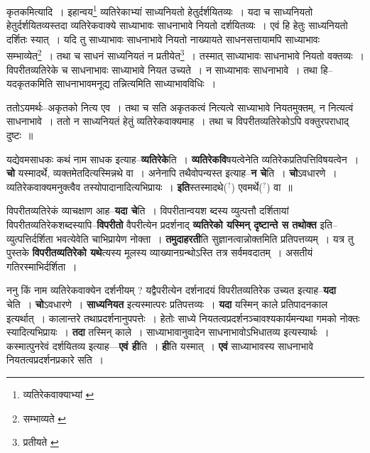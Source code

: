 \documentclass[article,12pt,a4paper]{memoir}
\newcommand{\unclear}[1]{($^{?}$#1)}
\begin{document}
	  \pstart कृतकमित्यादि । इहान्वय\footnote{व्यतिरेकवाक्याभ्यां \cite{dp-msA} \cite{dp-msB} \cite{dp-msD} \cite{dp-edP} \cite{dp-edH} \cite{dp-edE} \cite{dp-edN}} व्यतिरेकाभ्यां साध्यनियतो हेतुर्दर्शयितव्यः । यदा च साध्यनियतो हेतुर्दर्शयितव्यस्तदा व्यतिरेकवाक्ये साध्याभावः साधनाभावे नियतो दर्शयितव्यः । एवं हि हेतुः साध्यनियतो दर्शितः स्यात् । यदि तु साध्याभावः साधनाभावे नियतो नाख्यायते साधनसत्तायामपि साध्याभावः सम्भाव्येत\footnote{सम्भाव्यते \cite{dp-msB}} । तथा च साधनं साध्यनियतं न प्रतीयेत\footnote{प्रतीयते \cite{dp-msB} \cite{dp-msC}} । तस्मात् साध्याभावः साधनाभावे नियतो वक्तव्यः । विपरीतव्यतिरेके च साधनाभावः साध्याभावे नियत उच्यते । न साध्याभावः साधनाभावे । तथा हि--यदकृतकमिति साधनाभावमनूद्य तन्नित्यमिति साध्याभावविधिः ।
	\pend
       

	  \pstart ततोऽयमर्थः--अकृतको नित्य एव । तथा च सति अकृतकत्वं नित्यत्वे साध्याभावे नियतमुक्तम्, न नित्यत्वं साधनाभावे । ततो न साध्यनियतं हेतुं व्यतिरेकवाक्यमाह । तथा च विपरीतव्यतिरेकोऽपि वक्तुरपराधाद् दुष्टः ॥
	\pend
      
	  \endgroup
	

	  \pstart यद्येवमसाधकः कथं नाम साधक इत्याह--\textbf{व्यतिरेके}ति । \textbf{व्यतिरेकवि}षयत्वेनेति व्यतिरेकप्रतिपत्तिविषयत्वेन । \textbf{चो} यस्मादर्थे, व्यक्तमेतदित्यस्मिन्नथे वा । अनेनापि तथैवोपन्यस्त इत्याह--\textbf{न चे}ति । \textbf{चो}ऽवधारणे । व्यतिरेकवाक्यमनुक्त्वैव तस्योपादानादित्यभिप्रायः । \textbf{इति}स्तस्मादथे\unclear{} एवमर्थे\unclear{} वा ॥
	\pend
      

	  \pstart विपरीतव्यतिरेकं व्याचक्षाण आह--\textbf{यदा चे}ति । विपरीतान्वयश \leavevmode{} ब्दस्य व्युत्पत्तौ दर्शितायां विपरीतव्यतिरेकशब्दस्यापि--\textbf{विपरीतो} वैपरीत्येन प्रदर्शनाद् \textbf{व्यतिरेको यस्मिन् दृष्टान्ते स तथोक्त} इति--व्युत्पत्तिर्दर्शिता भवत्येवेति चाभिप्रायेण नोक्ता । \textbf{तमुदाहरती}ति सुज्ञानत्वान्नोक्तमिति प्रतिपत्तव्यम् । यत्र तु पुस्तके \textbf{विपरीतव्यतिरेको यथे}त्यस्य मूलस्य व्याख्यानग्रन्थोऽस्ति तत्र सर्वमवदातम् । असतीयं गतिरस्माभिर्दर्शिता ।
	\pend
      

	  \pstart ननु किं नाम व्यतिरेकवाक्येन दर्शनीयम् ? यद्वैपरीत्येन दर्शनादयं विपरीतव्यतिरेक उच्यत इत्याह--\textbf{यदा} चेति । \textbf{चो}ऽवधारणे । \textbf{साध्यनियत} इत्यस्मात्परः प्रतिपत्तव्यः । \textbf{यदा} यस्मिन् काले प्रतिपादनकाल इत्यर्थात् । कालान्तरे तथाप्रदर्शनानुपपत्तेः । हेतोः साध्ये नियतत्वप्रदर्शनञ्चावश्यकार्यमन्यथा गमको नोक्तः स्यादित्यभिप्रायः । \textbf{तदा} तस्मिन् काले । साध्याभावानुवादेन साधनाभावोऽभिधातव्य इत्यस्यार्थः । कस्मात्पुनरेवं दर्शयितव्य इत्याह—\textbf{एवं ही}ति । \textbf{ही}ति यस्मात् । \textbf{एवं} साध्याभावस्य साधनाभावे नियतत्वप्रदर्शनप्रकारे सति ।
	\pend
      
\end{document}
